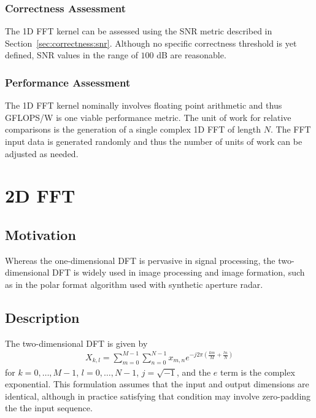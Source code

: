 \documentclass{report}
\begin{document}
\subsubsection{Correctness Assessment}

The 1D FFT kernel can be assessed using the SNR metric described
in Section~\ref{sec:correctness:snr}.
Although no specific correctness threshold is yet defined, SNR values in the
range of $100$ dB are reasonable.

\subsubsection{Performance Assessment}

The 1D FFT kernel nominally involves floating point arithmetic and thus
GFLOPS/W is one viable performance metric.
The unit of work for relative comparisons is the generation of a single complex
1D FFT of length $N$.
The FFT input data is generated randomly and thus the number of units of work
can be adjusted as needed.


\section{2D FFT}

\subsection{Motivation}

Whereas the one-dimensional DFT is pervasive in signal processing, the
two-dimensional DFT is widely used in image processing and image formation,
such as in the polar format algorithm used with synthetic aperture radar.

\subsection{Description}

The two-dimensional DFT is given by
\begin{align}
    X_{k,l} = \sum_{m=0}^{M-1} \sum_{n=0}^{N-1} x_{m,n} e^{-j2\pi \left(\frac{km}{M} + \frac{ln}{N}\right)}
\end{align}
for $k = 0, \ldots, M-1$, $l = 0, \ldots, N-1$, $j = \sqrt{-1}$, and
the $e$ term is the complex exponential.
This formulation assumes that the input and output dimensions
are identical, although in practice satisfying that condition may
involve zero-padding the the input sequence.
\end{document}

